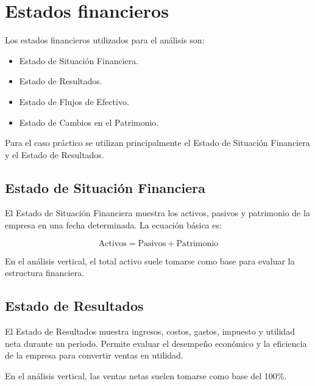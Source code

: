 \section{Estados financieros}

Los estados financieros utilizados para el análisis son:

\begin{itemize}
  \item Estado de Situación Financiera.
  \item Estado de Resultados.
  \item Estado de Flujos de Efectivo.
  \item Estado de Cambios en el Patrimonio.
\end{itemize}

Para el caso práctico se utilizan principalmente el Estado de Situación Financiera y el Estado de Resultados.

\subsection{Estado de Situación Financiera}

El Estado de Situación Financiera muestra los activos, pasivos y patrimonio de la empresa en una fecha determinada. La ecuación básica es:

\[
\text{Activos} = \text{Pasivos} + \text{Patrimonio}
\]

En el análisis vertical, el total activo suele tomarse como base para evaluar la estructura financiera.

\subsection{Estado de Resultados}

El Estado de Resultados muestra ingresos, costos, gastos, impuesto y utilidad neta durante un periodo. Permite evaluar el desempeño económico y la eficiencia de la empresa para convertir ventas en utilidad.

En el análisis vertical, las ventas netas suelen tomarse como base del 100\%.
